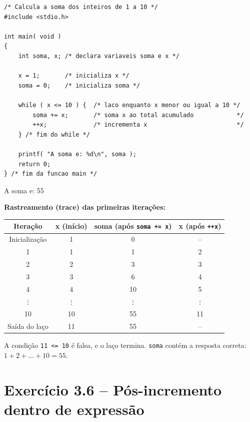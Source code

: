 \documentclass[12pt,a4paper]{article}
\begin{document}
\begin{respostabox}
\begin{lstlisting}
/* Calcula a soma dos inteiros de 1 a 10 */
#include <stdio.h>

int main( void )
{
    int soma, x; /* declara variaveis soma e x */

    x = 1;       /* inicializa x */
    soma = 0;    /* inicializa soma */

    while ( x <= 10 ) {  /* laco enquanto x menor ou igual a 10 */
        soma += x;       /* soma x ao total acumulado            */
        ++x;             /* incrementa x                         */
    } /* fim do while */

    printf( "A soma e: %d\n", soma );
    return 0;
} /* fim da funcao main */
\end{lstlisting}

\begin{saida}
A soma e: 55
\end{saida}

\medskip
\textbf{Rastreamento (trace) das primeiras iterações:}

\begin{center}
\renewcommand{\arraystretch}{1.4}
\begin{tabular}{c c c c}
  \toprule
  \textbf{Iteração} & \textbf{x (início)} & \textbf{soma (após \texttt{soma += x})} & \textbf{x (após \texttt{++x})} \\ \midrule
  Inicialização & 1 & 0 & -- \\
  1 & 1 & 1 & 2 \\
  2 & 2 & 3 & 3 \\
  3 & 3 & 6 & 4 \\
  4 & 4 & 10 & 5 \\
  $\vdots$ & $\vdots$ & $\vdots$ & $\vdots$ \\
  10 & 10 & 55 & 11 \\
  Saída do laço & 11 & 55 & -- \\
  \bottomrule
\end{tabular}
\end{center}

A condição \texttt{11 <= 10} é falsa, e o laço termina. \texttt{soma} contém a
resposta correta: $1+2+\ldots+10 = 55$.
\end{respostabox}

\newpage

\section{Exercício 3.6 -- Pós-incremento dentro de expressão}
\end{document}
